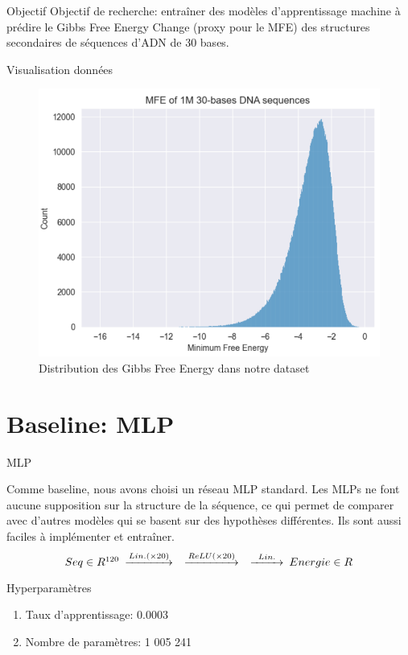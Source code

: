 \documentclass{beamer}
\begin{document}
\begin{frame}{Objectif}
Objectif de recherche: entraîner des modèles d'apprentissage machine à prédire le Gibbs Free Energy Change (proxy pour le MFE) des structures secondaires de séquences d'ADN de 30 bases.

\end{frame}

\begin{frame}{Visualisation données}

\begin{figure} \label{fig:MFE_nupack}
    \caption{Distribution des Gibbs Free Energy dans notre dataset} \center
    \includegraphics[width=.7\textwidth]{images/MFE_nupack.png}
\end{figure}

\end{frame}

\section{Baseline: MLP}
\begin{frame}{MLP}

Comme baseline, nous avons choisi un réseau MLP standard. Les MLPs ne font aucune supposition sur la structure de la séquence, ce qui permet de comparer avec d'autres modèles qui se basent sur des hypothèses différentes. Ils sont aussi faciles à implémenter et entraîner. 
\begin{equation*}
    \begin{CD}
        @. Seq \in R^{120}
        @>Lin. (\times 20)>> 
        @>ReLU (\times 20)>> 
        @>Lin.>> 
        Energie \in R
    \end{CD}
\end{equation*}

\begin{block}{Hyperparamètres}
\begin{enumerate}
    \item Taux d'apprentissage: 0.0003
    \item Nombre de paramètres: 1 005 241
\end{enumerate}
\end{block}

\end{frame}
\end{document}
